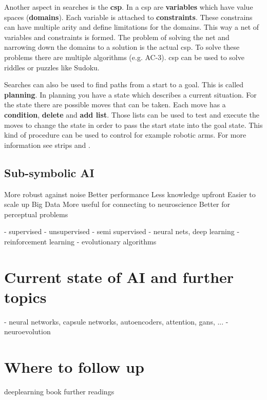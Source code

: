 \documentclass[jou,apacite]{apa6}
\begin{document}
Another aspect in searches is the \textbf{\gls{csp}}. In a \gls{csp} are \textbf{variables} which have value spaces (\textbf{domains}). Each variable is attached to \textbf{constraints}. These constrains can have multiple arity and define limitations for the domains. 
This way a net of variables and constraints is formed. The problem of solving the net and narrowing down the domains to a solution is the actual \gls{csp}. To solve these problems there are multiple algorithms (e.g. AC-3). \gls{csp} can be used to solve riddles or puzzles like Sudoku.

Searches can also be used to find paths from a start to a goal. This is called \textbf{planning}. In planning you have a state which describes a current situation. For the state there are possible moves that can be taken. Each move has a \textbf{condition}, \textbf{delete} and \textbf{add list}. Those lists can be used to test and execute the moves to change the state in order to pass the start state into the goal state. This kind of procedure can be used to control for example robotic arms. For more information see \gls{strips} and \cite{Nilsson1982}.

\subsection{Sub-symbolic AI}
More robust against noise
Better performance
Less knowledge upfront
Easier to scale up
Big Data
More useful for connecting to
neuroscience
Better for perceptual
problems

  - supervised
  - unsupervised
  - semi supervised
   - neural nets, deep learning
  - reinforcement learning
  - evolutionary algorithms

\section{Current state of AI and further topics}
 - neural networks, capsule networks, autoencoders, attention, gans, ...
 - neuroevolution

\section{Where to follow up}
deeplearning book
further readings

\printglossaries
\printindex

\end{document}
